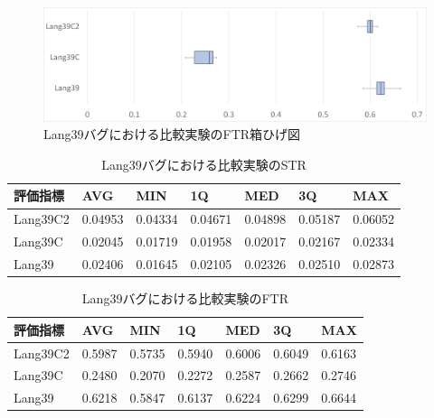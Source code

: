 \documentclass[uplatex,dvipdfmx,a4paper]{jsarticle}
\begin{document}
\begin{figure}[t]
  \centering
  \includegraphics[width=\linewidth]{fig/cons_FTR.png}
  \caption{Lang39バグにおける比較実験のFTR箱ひげ図}
  \label{fig:cons-FTR}
\end{figure}
\begin{table}[b]
  \centering
  \caption{Lang39バグにおける比較実験のSTR}
  \label{tab:res-comparison-STR}
  \begin{tabular}{l|llllll} \hline\hline
    評価指標 & AVG         & MIN & 1Q & MED & 3Q & MAX   \\\hline
    Lang39C2 & 0.04953 & 0.04334 & 0.04671 & 0.04898 & 0.05187 & 0.06052 \\
    Lang39C & 0.02045 & 0.01719 & 0.01958 & 0.02017 & 0.02167 & 0.02334 \\
    Lang39 & 0.02406 & 0.01645 & 0.02105 & 0.02326 & 0.02510 & 0.02873  \\\hline\hline
  \end{tabular}
\end{table}
\begin{table}[b]
  \centering
  \caption{Lang39バグにおける比較実験のFTR}
  \label{tab:res-comparison-FTR}
  \begin{tabular}{l|llllll} \hline\hline
    評価指標 & AVG         & MIN & 1Q & MED & 3Q & MAX   \\\hline
    Lang39C2 & 0.5987 & 0.5735 & 0.5940 & 0.6006 & 0.6049 & 0.6163 \\
    Lang39C & 0.2480 & 0.2070 & 0.2272 & 0.2587 & 0.2662 & 0.2746   \\
    Lang39 & 0.6218 & 0.5847 & 0.6137 & 0.6224 & 0.6299 & 0.6644 \\\hline\hline
  \end{tabular}
\end{table}
\end{document}
